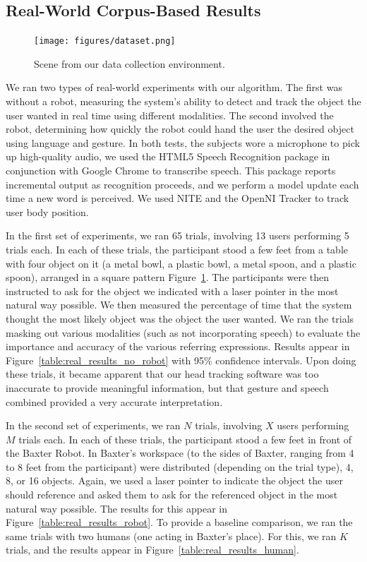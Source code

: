 \documentclass[graybox]{svmult}
\begin{document}
\subsection{Real-World Corpus-Based Results}

\begin{figure}
\centering
\texttt{[image: figures/dataset.png]}
\caption{Scene from our data collection environment.\label{fig:corpus_scene}}
\end{figure}

We ran two types of real-world experiments with our algorithm. The first was without a robot, measuring the system's ability to detect and track the object the user wanted in real time using different modalities. The second involved the robot, determining how quickly the robot could hand the user the desired object using language and gesture. In both tests, the subjects wore a microphone to pick up high-quality audio, we used the HTML5 Speech Recognition package in conjunction with Google Chrome to transcribe speech. This package reports incremental output as recognition proceeds, and we perform a model update each time a new word is perceived. We used NITE and the OpenNI Tracker to track user body position. 


In the first set of experiments, we ran 65 trials, involving 13 users performing 5 trials each. In each of these trials, the participant stood a few feet from a table with four object on it (a metal bowl, a plastic bowl, a metal spoon, and a plastic spoon), arranged in a square pattern Figure~\ref{fig:corpus_scene}. The participants were then instructed to ask for the object we indicated with a laser pointer in the most natural way possible. We then measured the percentage of time that the system thought the most likely object was the object the user wanted. We ran the trials masking out various modalities (such as not incorporating speech) to evaluate the importance and accuracy of the various referring expressions. Results appear in Figure~\ref{table:real_results_no_robot} with 95\% confidence intervals. Upon doing these trials, it became apparent that our head tracking software was too inaccurate to provide meaningful information, but that gesture and speech combined provided a very accurate interpretation.


In the second set of experiments, we ran $N$ trials, involving $X$ users performing $M$ trials each. In each of these trials, the participant stood a few feet in front of the Baxter Robot. In Baxter's workspace (to the sides of Baxter, ranging from 4 to 8 feet from the participant) were distributed (depending on the trial type), 4, 8, or 16 objects. Again, we used a laser pointer to indicate the object the user should reference and asked them to ask for the referenced object in the most natural way possible. The results for this appear in Figure~\ref{table:real_results_robot}. To provide a baseline comparison, we ran the same trials with two humans (one acting in Baxter's place). For this, we ran $K$ trials, and the results appear in Figure~\ref{table:real_results_human}.
\end{document}
